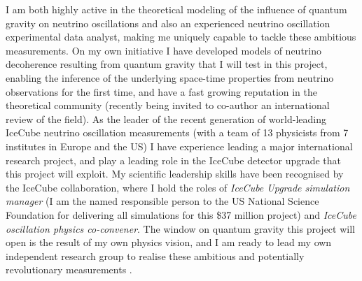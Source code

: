\documentclass[a4paper,11pt]{article}
\newcounter{bar}
\begin{document}
I am both highly active in the theoretical modeling of the influence of quantum gravity on neutrino oscillations and also an experienced neutrino oscillation experimental data analyst, making me uniquely capable to tackle these ambitious measurements. On my own initiative I have developed models of neutrino decoherence resulting from quantum gravity that I will test in this project, enabling the inference of the underlying space-time properties from neutrino observations for the first time, and have a fast growing reputation in the theoretical community (recently being invited to co-author an international review of the field). As the leader of the recent generation of world-leading IceCube neutrino oscillation measurements (with a team of 13 physicists from 7 institutes in Europe and the US) I have experience leading a major international research project, and play a leading role in the IceCube detector upgrade that this project will exploit. My scientific leadership skills have been recognised by the IceCube collaboration, where I hold the roles of \textit{IceCube Upgrade simulation manager} (I am the named responsible person to the US National Science Foundation for delivering all simulations for this \$37 million project) and \textit{IceCube oscillation physics co-convener}. The window on quantum gravity this project will open is the result of my own physics vision, and I am ready to lead my own independent research group to realise these ambitious and potentially revolutionary measurements . \\



\end{document}
